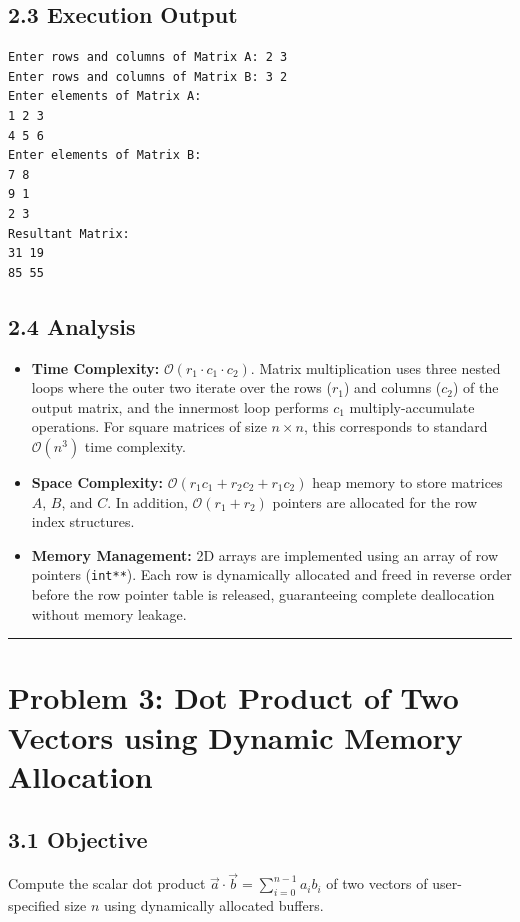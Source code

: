 \documentclass[12pt]{article}
\begin{document}
\subsection*{2.3 Execution Output}
\begin{lstlisting}[style=output]
Enter rows and columns of Matrix A: 2 3
Enter rows and columns of Matrix B: 3 2
Enter elements of Matrix A:
1 2 3
4 5 6
Enter elements of Matrix B:
7 8
9 1
2 3
Resultant Matrix:
31 19 
85 55 
\end{lstlisting}

\subsection*{2.4 Analysis}
\begin{itemize}
    \item \textbf{Time Complexity:} $\mathcal{O}(r_1 \cdot c_1 \cdot c_2)$. Matrix multiplication uses three nested loops where the outer two iterate over the rows ($r_1$) and columns ($c_2$) of the output matrix, and the innermost loop performs $c_1$ multiply-accumulate operations. For square matrices of size $n \times n$, this corresponds to standard $\mathcal{O}(n^3)$ time complexity.
    \item \textbf{Space Complexity:} $\mathcal{O}(r_1 c_1 + r_2 c_2 + r_1 c_2)$ heap memory to store matrices $A$, $B$, and $C$. In addition, $\mathcal{O}(r_1 + r_2)$ pointers are allocated for the row index structures.
    \item \textbf{Memory Management:} 2D arrays are implemented using an array of row pointers (\texttt{int**}). Each row is dynamically allocated and freed in reverse order before the row pointer table is released, guaranteeing complete deallocation without memory leakage.
\end{itemize}

\vspace{10pt}
\hrule
\vspace{10pt}

\section*{Problem 3: Dot Product of Two Vectors using Dynamic Memory Allocation}

\subsection*{3.1 Objective}
Compute the scalar dot product $\vec{a} \cdot \vec{b} = \sum_{i=0}^{n-1} a_i b_i$ of two vectors of user-specified size $n$ using dynamically allocated buffers.
\end{document}
